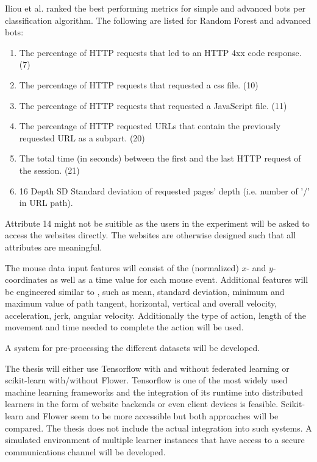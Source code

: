 \documentclass[
    fontsize=12pt,
    headings=small,
    parskip=half,           %
    bibliography=totoc,
    numbers=noenddot,       %
    open=any,               %
    final                   %
    ]{scrreprt}
\begin{document}
Iliou et al. \cite{10.1145/3339252.3339267} ranked the best performing metrics for simple and advanced bots per classification algorithm. The following are listed for Random Forest and advanced bots:


\begin{enumerate}
	\item The percentage of HTTP requests that led to an HTTP 4xx code response. (7)
	\item The percentage of HTTP requests that requested a css file. (10)
	\item The percentage of HTTP requests that requested a JavaScript file. (11)
	\item The percentage of HTTP requested URLs that contain the previously requested URL as a subpart. (20)
	\item The total time (in seconds) between the first and the last HTTP request of the session. (21)
	\item 16 Depth SD Standard deviation of requested pages' depth (i.e. number of ’/’ in URL path).
\end{enumerate}

Attribute 14 might not be suitible as the users in the experiment will be asked to access the websites directly. The websites are otherwise designed such that all attributes are meaningful.

The mouse data input features will consist of the (normalized) $x$- and $y$-coordinates as well as a time value for each mouse event. Additional features will be engineered similar to \cite{DBLP:journals/corr/abs-1810-04668}, such as mean, standard deviation, minimum and maximum value of path tangent, horizontal, vertical and overall velocity, acceleration, jerk, angular velocity. Additionally the type of action, length of the movement and time needed to complete the action will be used.

A system for pre-processing the different datasets will be developed.

The thesis will either use Tensorflow with and without federated learning or scikit-learn with/without Flower.
Tensorflow is one of the most widely used machine learning frameworks and the integration of its runtime into distributed learners in the form of website backends or even client devices is feasible. Scikit-learn and Flower seem to be more accessible but both approaches will be compared. The thesis does not include the actual integration into such systems. A simulated environment of multiple learner instances that have access to a secure communications channel will be developed.
\end{document}
